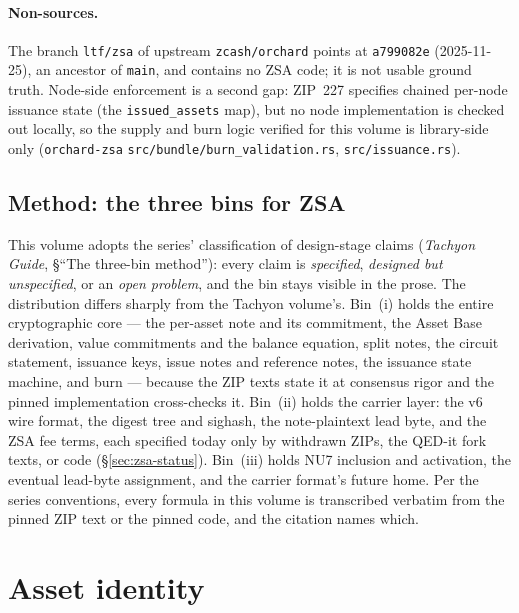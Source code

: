 \documentclass[11pt,a4paper]{article}
\theoremstyle{definition}
\begin{document}
\paragraph{Non-sources.} The branch \texttt{ltf/zsa} of upstream
\texttt{zcash/orchard} points at \texttt{a799082e} (2025-11-25), an ancestor
of \texttt{main}, and contains no ZSA code; it is not usable ground truth.
Node-side enforcement is a second gap: ZIP~227 specifies chained per-node
issuance state (the \texttt{issued\_assets} map), but no node implementation
is checked out locally, so the supply and burn logic verified for this volume
is library-side only (\texttt{orchard-zsa}
\texttt{src/bundle/burn\_validation.rs}, \texttt{src/issuance.rs}).

\subsection{Method: the three bins for ZSA}\label{sec:zsa-method}

This volume adopts the series' classification of design-stage claims
(\emph{Tachyon Guide}, \S``The three-bin method''): every claim is
\emph{specified}, \emph{designed but unspecified}, or an \emph{open problem},
and the bin stays visible in the prose. The distribution differs sharply from
the Tachyon volume's. Bin~(i) holds the entire cryptographic core --- the
per-asset note and its commitment, the Asset Base derivation, value
commitments and the balance equation, split notes, the circuit statement,
issuance keys, issue notes and reference notes, the issuance state machine,
and burn --- because the ZIP texts state it at consensus rigor and the pinned
implementation cross-checks it. Bin~(ii) holds the carrier layer: the v6 wire
format, the digest tree and sighash, the note-plaintext lead byte, and the
ZSA fee terms, each specified today only by withdrawn ZIPs, the QED-it fork
texts, or code (\S\ref{sec:zsa-status}). Bin~(iii) holds NU7 inclusion and
activation, the eventual lead-byte assignment, and the carrier format's
future home. Per the series conventions, every formula in this volume is
transcribed verbatim from the pinned ZIP text or the pinned code, and the
citation names which.

\section{Asset identity}\label{sec:zsa-asset-identity}
\end{document}
